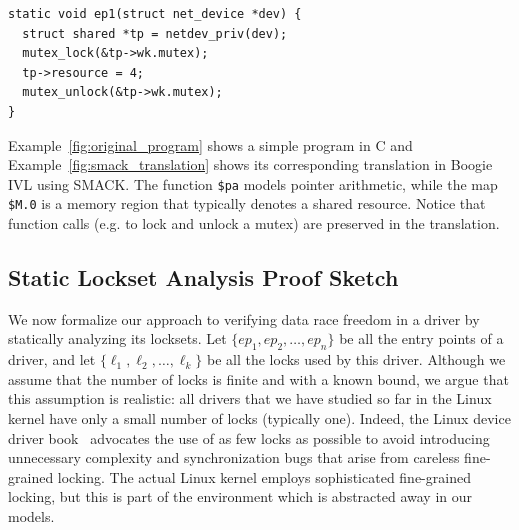 \begin{lstlisting}[caption = Simple networking entry point in C, label = fig:original_program]
static void ep1(struct net_device *dev) {
  struct shared *tp = netdev_priv(dev);
  mutex_lock(&tp->wk.mutex);
  tp->resource = 4;
  mutex_unlock(&tp->wk.mutex);
}
\end{lstlisting}

Example~\ref{fig:original_program} shows a simple program in C and Example~\ref{fig:smack_translation} shows its corresponding translation in Boogie IVL using SMACK. The function \texttt{\$pa} models pointer arithmetic, while the map \texttt{\$M.0} is a memory region that typically denotes a shared resource. Notice that function calls (e.g. to lock and unlock a mutex) are preserved in the translation.


\subsection{Static Lockset Analysis Proof Sketch}
\label{whoop:proof}

We now formalize our approach to verifying data race freedom in a driver by statically analyzing its locksets. Let $\{_{1}, _{2}, \dotsc, _{n}\}$ be all the entry points of a driver, and let $\{\ell_{1}, \ell_{2}, \dotsc, \ell_{k}\}$ be all the locks used by this driver. Although we assume that the number of locks is finite and with a known bound, we argue that this assumption is realistic: all drivers that we have studied so far in the Linux kernel have only a small number of locks (typically one). Indeed, the Linux device driver book~\cite{corbet2005linux} advocates the use of as few locks as possible to avoid introducing unnecessary complexity and synchronization bugs that arise from careless fine-grained locking. The actual Linux kernel employs sophisticated fine-grained locking, but this is part of the environment which is abstracted away in our models.

